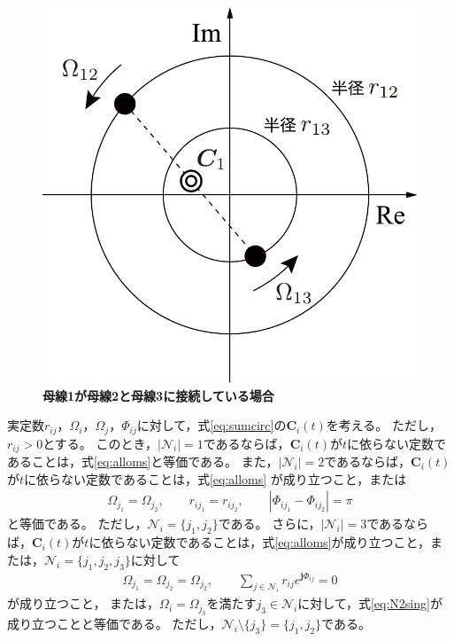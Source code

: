 \documentclass[tombow,dvipdfmx]{corona-a5-1.1}
\begin{document}
\begin{figure}[t]
\centering
\includegraphics[width = .4\linewidth]{figs/centerg}
\medskip
\caption{\textbf{母線1が母線2と母線3に接続している場合}}
\label{fig:centerg}
\medskip
\end{figure}


\begin{補題}[電力潮流方程式から導かれる母線の同期]
\label{lem:sumc2}
実定数$r_{ij}$，$\Omega_i$，$\Omega_j$，$\Phi_{ij}$に対して，式\ref{eq:sumcirc}の$\bm{C}_i (t)$を考える。
ただし，$r_{ij}>0$とする。
このとき，$|\mathcal{N}_i|=1$であるならば，$\bm{C}_i (t)$が$t$に依らない定数であることは，式\ref{eq:alloms}と等価である。
また，$|\mathcal{N}_i|=2$であるならば，$\bm{C}_i (t)$が$t$に依らない定数であることは，式\ref{eq:alloms}
が成り立つこと，または
\begin{align}\label{eq:N2sing}
\Omega_{j_1} = \Omega_{j_2}
,\qquad
r_{i j_1} = r_{i j_2}
,\qquad
|\Phi_{i j_1}-\Phi_{i j_2}| = \pi
\end{align}
と等価である。
ただし，$\mathcal{N}_i = \{j_1,j_2\}$である。
さらに，$|\mathcal{N}_i|=3$であるならば，$\bm{C}_i (t)$が$t$に依らない定数であることは，式\ref{eq:alloms}が成り立つこと，または，$ \mathcal{N}_i =\{j_1,j_2,j_3\}$に対して
\begin{align}\label{eq:threeoms}
\Omega_{j_1} = \Omega_{j_2}= \Omega_{j_2}
,\qquad 
\sum_{j\in \mathcal{N}_i} 
r_{ij} e^{\bm{j} \Phi_{ij}}=0
\end{align}
が成り立つこと，
または，$\Omega_{i} = \Omega_{j_3}$を満たす$j_3 \in \mathcal{N}_i$に対して，式\ref{eq:N2sing}が成り立つことと等価である。
ただし，$ \mathcal{N}_i \setminus \{j_3\}=\{j_1,j_2\}$である。
\end{補題}
\end{document}
